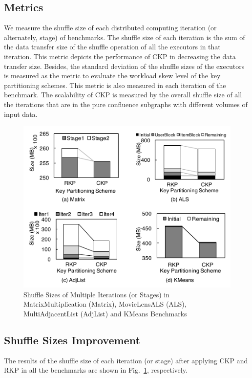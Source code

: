 \documentclass[10pt,journal,compsoc]{IEEEtran}
\begin{document}
\subsection{Metrics}
We measure the shuffle size of each distributed computing iteration (or alternately, stage) of benchmarks. 
The shuffle size of each iteration is the sum of the data transfer size of the shuffle operation of all the executors in that iteration. 
This metric depicts the performance of CKP in decreasing the data transfer size. 
Besides, the standard deviation of the shuffle sizes of the executors is measured as the metric to evaluate the workload skew level of the key partitioning schemes. 
This metric is also measured in each iteration of the benchmark. 
The scalability of CKP is measured by the overall shuffle size of all the iterations that are in the pure confluence subgraphs with different volumes of input data. 

\begin{figure}[!t]
\centering
\includegraphics[width=1\columnwidth]{figure5}
\caption{Shuffle Sizes of Multiple Iterations (or Stages) in MatrixMultiplication (Matrix), MovieLensALS (ALS), MultiAdjacentList (AdjList) and KMeans Benchmarks
}
\label{fig:size}
\end{figure}


\subsection{Shuffle Sizes Improvement} 
The results of the shuffle size of each iteration (or stage) after applying CKP and RKP in all the benchmarks are shown in Fig.~\ref{fig:size}, respectively. 
\end{document}
